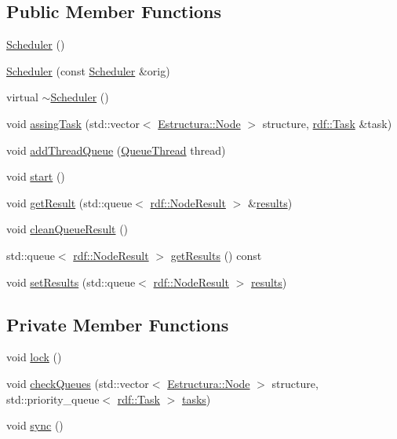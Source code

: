 \subsection*{Public Member Functions}
\begin{DoxyCompactItemize}
\item 
\hyperlink{classScheduler_a3b61aac11466cd45ae42ab8c2b0013f6}{Scheduler} ()
\item 
\hyperlink{classScheduler_ae42ce9b6724e40c750ef6619bb35bee3}{Scheduler} (const \hyperlink{classScheduler}{Scheduler} \&orig)
\item 
virtual \hyperlink{classScheduler_afc8187779b46f64039d3ffa58f0dbe51}{$\sim$\+Scheduler} ()
\item 
void \hyperlink{classScheduler_a67fd277bb0cf15c2aa437cd1f7ed6e0a}{assing\+Task} (std\+::vector$<$ \hyperlink{structEstructura_1_1Node}{Estructura\+::\+Node} $>$ structure, \hyperlink{classrdf_1_1Task}{rdf\+::\+Task} \&task)
\item 
void \hyperlink{classScheduler_abc04c3760251ca922019db0cec5f0d50}{add\+Thread\+Queue} (\hyperlink{classQueueThread}{Queue\+Thread} thread)
\item 
void \hyperlink{classScheduler_a63a264c69136bace160286ef30ed0c11}{start} ()
\item 
void \hyperlink{classScheduler_a200281a389579bc17faf446f52efc801}{get\+Result} (std\+::queue$<$ \hyperlink{classrdf_1_1NodeResult}{rdf\+::\+Node\+Result} $>$ \&\hyperlink{classScheduler_a93faf0df4ed95016cdb5224bd2725c3f}{results})
\item 
void \hyperlink{classScheduler_a0f1e295c22d686d6888a22ebdc57869f}{clean\+Queue\+Result} ()
\item 
std\+::queue$<$ \hyperlink{classrdf_1_1NodeResult}{rdf\+::\+Node\+Result} $>$ \hyperlink{classScheduler_a8864f6b658cf4d2a6d9d78a84c6d81f7}{get\+Results} () const 
\item 
void \hyperlink{classScheduler_a9e9839fbddf57961b055e32144db7d9a}{set\+Results} (std\+::queue$<$ \hyperlink{classrdf_1_1NodeResult}{rdf\+::\+Node\+Result} $>$ \hyperlink{classScheduler_a93faf0df4ed95016cdb5224bd2725c3f}{results})
\end{DoxyCompactItemize}
\subsection*{Private Member Functions}
\begin{DoxyCompactItemize}
\item 
void \hyperlink{classScheduler_a903ad54edab99f678aef0f79e2b426f8}{lock} ()
\item 
void \hyperlink{classScheduler_a157e2d59b776d904c07c81d47af5d3df}{check\+Queues} (std\+::vector$<$ \hyperlink{structEstructura_1_1Node}{Estructura\+::\+Node} $>$ structure, std\+::priority\+\_\+queue$<$ \hyperlink{classrdf_1_1Task}{rdf\+::\+Task} $>$ \hyperlink{classScheduler_adbcdf6edd31a2e8e088eb5bc91b4465e}{tasks})
\item 
void \hyperlink{classScheduler_a6f86da54c4ec3f2566ce7251d59c8302}{sync} ()
\end{DoxyCompactItemize}
